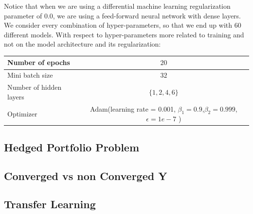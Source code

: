 Notice that when we are using a differential machine learning regularization parameter of 0.0, we are using a feed-forward neural network with dense layers. We consider every combination of hyper-parameters, so that we end up with $60$ different models. With respect to hyper-parameters more related to training and not on the model architecture and its regularization:


\begin{center}
\begin{tabular}{||l | c||} 
 \hline
 Number of epochs & $20$ \\
 \hline
 Mini batch size  & $32$  \\
 \hline
 Number of hidden layers  & $\{1 ,2 ,4 ,6\}$  \\
 \hline
 Optimizer &  Adam(learning rate = 0.001, $\beta_1=0.9$,$\beta_2=0.999$,$\epsilon=1e-7$ ) \\
  \hline
 \end{tabular}
\end{center}





\subsection{Hedged Portfolio Problem}
\subsection{Converged vs non Converged Y}
\subsection{Transfer Learning}





